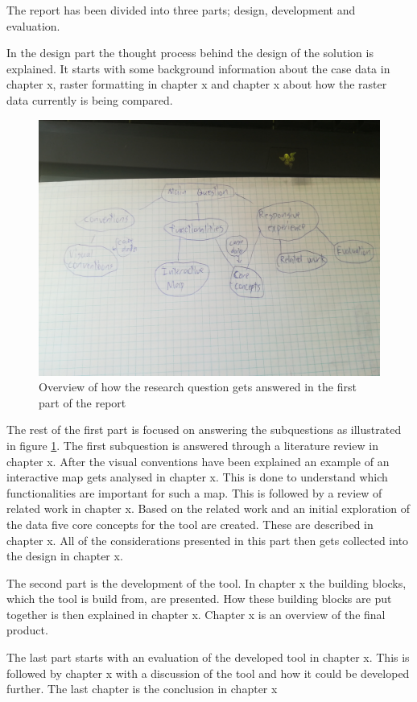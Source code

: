 %
%

The report has been divided into three parts; design, development and evaluation.




In the design part the thought process behind the design of the solution is explained.
It starts with some background information about the case data in chapter x, raster formatting in chapter x and chapter x about how the raster data currently is being compared. 

\begin{figure} [H]
	\centering
	\includegraphics[width=.8\textwidth]{Pictures/Structure}
	\caption{Overview of how the research question gets answered in the first part of the report}
	\label{Structure}
\end{figure}

The rest of the first part is focused on answering the subquestions as illustrated in figure \ref{Structure}. 
The first subquestion is answered through a literature review in chapter x. After the visual conventions have been explained an example of an interactive map gets analysed in chapter x. This is done to understand which functionalities are important for such a map. This is followed by a review of related work in chapter x. Based on the related work and an initial exploration of the data five core concepts for the tool are created. These are described in chapter x. All of the considerations presented in this part then gets collected into the design in chapter x. 

The second part is the development of the tool. In chapter x the building blocks, which the tool is build from, are presented. How these building blocks are put together is then explained in chapter x. Chapter x is an overview of the final product.


The last part starts with an evaluation of the developed tool in chapter x. This is followed by chapter x with a discussion of the tool and how it could be developed further. The last chapter is the conclusion in chapter x 


